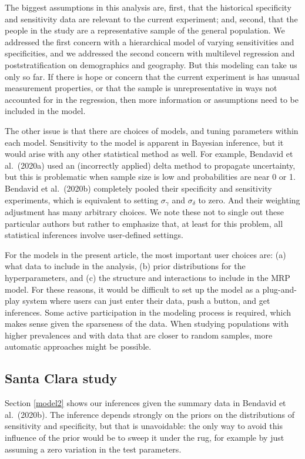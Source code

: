\documentclass[11pt]{article}
\begin{document}
The biggest assumptions in this analysis are, first, that the historical specificity and sensitivity data are relevant to the current experiment; and, second, that the people in the study are a representative sample of the general population.  We addressed the first concern with a hierarchical model of varying sensitivities and specificities, and we addressed the second concern with multilevel regression and poststratification on demographics and geography.  But this modeling can take us only so far.  If there is hope or concern that the current experiment is has unusual measurement properties, or that the sample is unrepresentative in ways not accounted for in the regression, then more information or assumptions need to be included in the model.

The other issue is that there are choices of models, and tuning parameters within each model.  Sensitivity to the model is apparent in Bayesian inference, but it would arise with any other statistical method as well.  For example, Bendavid et al.\ (2020a) used an (incorrectly applied) delta method to propagate uncertainty, but this is problematic when sample size is low and probabilities are near 0 or 1.  Bendavid  et al.\ (2020b) completely pooled their specificity and sensitivity experiments, which is equivalent to setting $\sigma_{\gamma}$ and $\sigma_{\delta}$ to zero.  And their weighting adjustment has many arbitrary choices.  We note these not to single out these particular authors but rather to emphasize that, at least for this problem, all statistical inferences involve user-defined settings.

For the models in the present article, the most important user choices are:  (a) what data to include in the analysis, (b) prior distributions for the hyperparameters, and (c) the structure and interactions to include in the MRP model.  For these reasons, it would be difficult to set up the model as a plug-and-play system where users can just enter their data, push a button, and get inferences.  Some active participation in the modeling process is required, which makes sense given the sparseness of the data.  When studying populations with higher prevalences and with data that are closer to random samples, more automatic approaches might be possible.

\subsection{Santa Clara study}

Section \ref{model2} shows our inferences given the summary data in Bendavid et al.\ (2020b).
The inference depends strongly on the priors on the distributions of sensitivity and specificity, but that is unavoidable:  the only way to avoid this influence of the prior would be to sweep it under the rug, for example by just assuming a zero variation in the test parameters.
\end{document}
